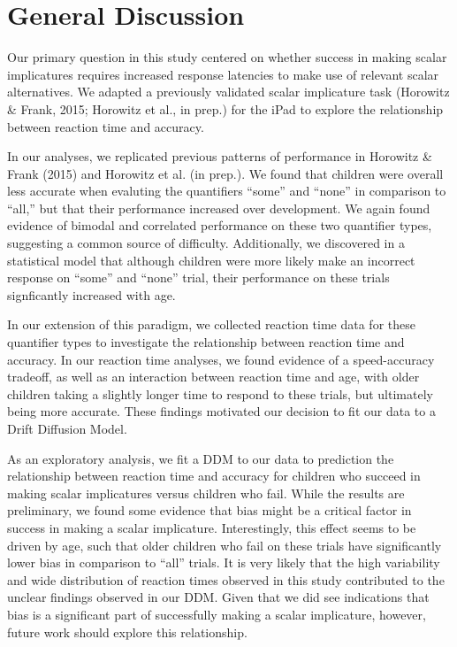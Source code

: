 \documentclass[10pt, letterpaper]{article}
\begin{document}
\section{General Discussion}\label{general-discussion}

Our primary question in this study centered on whether success in making
scalar implicatures requires increased response latencies to make use of
relevant scalar alternatives. We adapted a previously validated scalar
implicature task (Horowitz \& Frank, 2015; Horowitz et al., in prep.)
for the iPad to explore the relationship between reaction time and
accuracy.

In our analyses, we replicated previous patterns of performance in
Horowitz \& Frank (2015) and Horowitz et al. (in prep.). We found that
children were overall less accurate when evaluting the quantifiers
``some'' and ``none'' in comparison to ``all,'' but that their
performance increased over development. We again found evidence of
bimodal and correlated performance on these two quantifier types,
suggesting a common source of difficulty. Additionally, we discovered in
a statistical model that although children were more likely make an
incorrect response on ``some'' and ``none'' trial, their performance on
these trials signficantly increased with age.

In our extension of this paradigm, we collected reaction time data for
these quantifier types to investigate the relationship between reaction
time and accuracy. In our reaction time analyses, we found evidence of a
speed-accuracy tradeoff, as well as an interaction between reaction time
and age, with older children taking a slightly longer time to respond to
these trials, but ultimately being more accurate. These findings
motivated our decision to fit our data to a Drift Diffusion Model.

As an exploratory analysis, we fit a DDM to our data to prediction the
relationship between reaction time and accuracy for children who succeed
in making scalar implicatures versus children who fail. While the
results are preliminary, we found some evidence that bias might be a
critical factor in success in making a scalar implicature.
Interestingly, this effect seems to be driven by age, such that older
children who fail on these trials have significantly lower bias in
comparison to ``all'' trials. It is very likely that the high
variability and wide distribution of reaction times observed in this
study contributed to the unclear findings observed in our DDM. Given
that we did see indications that bias is a significant part of
successfully making a scalar implicature, however, future work should
explore this relationship.
\end{document}
